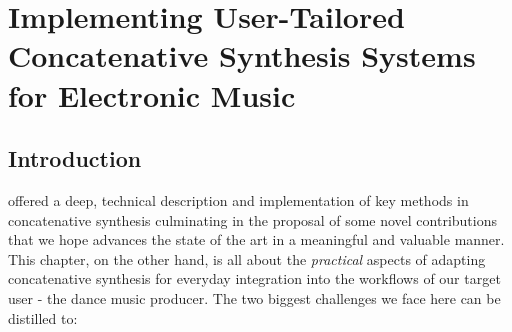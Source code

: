 \chapter{Implementing User-Tailored Concatenative Synthesis Systems for Electronic Music}
\label{chap:rhythmcat}

%
%
%
%
%
%
%

\section{Introduction}

 offered a deep, technical description and implementation of key methods in concatenative synthesis culminating in the proposal of some novel contributions that we hope advances the state of the art in a meaningful and valuable manner. This chapter, on the other hand, is all about the \textit{practical} aspects of adapting concatenative synthesis for everyday integration into the workflows of our target user - the dance music producer. The two biggest challenges we face here can be distilled to:

